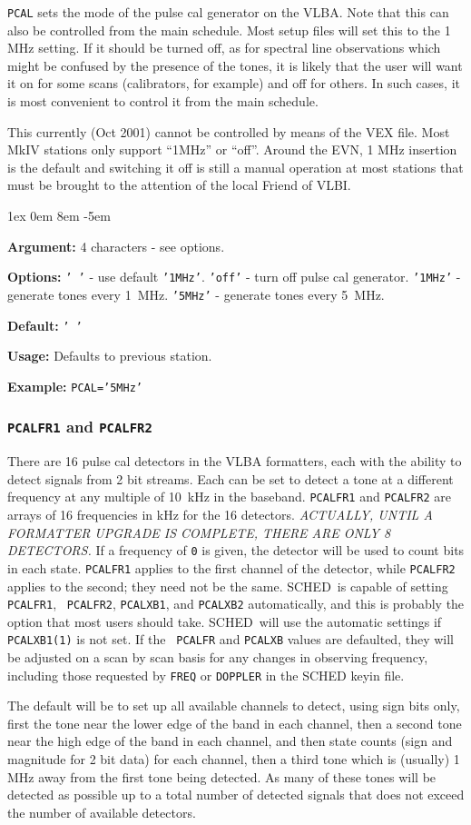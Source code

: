 \documentclass{report}
\newcommand{\schedb}{{\sc SCHED~}}
\newcommand{\rcwbox}[5]{
  \begin{list}{}{\parsep 1ex  \itemsep 0em
                 \leftmargin 8em  \itemindent -5em }
    \item {\bf Argument:} #1
    \item {\bf Options:}  #2
    \item {\bf Default:}  #3
    \item {\bf Usage:}    #4
    \item {\bf Example:}  #5
  \end{list}
}
\begin{document}
{\tt PCAL} sets the mode of the pulse cal generator on the VLBA.  Note
that this can also be controlled from the main schedule.  Most setup
files will set this to the 1 MHz setting.  If it should be turned
off, as for spectral line observations which might be confused by
the presence of the tones, it is likely that the user will want it
on for some scans (calibrators, for example) and off for others.  In
such cases, it is most convenient to control it from the main
schedule.

This currently (Oct 2001) cannot be controlled by means of the VEX
file. Most MkIV stations only support ``1MHz'' or ``off''. Around the
EVN, 1 MHz insertion is the default and switching it off is still a
manual operation at most stations that must be brought to the attention
of the local Friend of VLBI.

\rcwbox
{4 characters - see options.}
{{\tt ' '} - use default {\tt '1MHz'}. {\tt 'off'} - turn off pulse
cal generator. {\tt '1MHz'} - generate tones every 1~MHz. {\tt '5MHz'}
- generate tones every 5~MHz.}
{{\tt ' '}}
{Defaults to previous station.}
{{\tt PCAL='5MHz'}}


\subsubsection{\label{SP:PCALFR1}{\tt PCALFR1} and {\tt PCALFR2}}

There are 16 pulse cal detectors in the VLBA formatters, each with the
ability to detect signals from 2 bit streams. Each can be set to
detect a tone at a different frequency at any multiple of 10~kHz in
the baseband. {\tt PCALFR1} and {\tt PCALFR2} are arrays of 16
frequencies in kHz for the 16 detectors. {\em ACTUALLY, UNTIL A
FORMATTER UPGRADE IS COMPLETE, THERE ARE ONLY 8 DETECTORS.} If a
frequency of {\tt 0} is given, the detector will be used to count bits
in each state. {\tt PCALFR1} applies to the first channel of the
detector, while {\tt PCALFR2} applies to the second; they need not be
the same. \schedb is capable of setting {\tt PCALFR1}, {\tt
PCALFR2}, {\tt PCALXB1}, and {\tt PCALXB2} automatically, and this is
probably the option that most users should take. \schedb will use
the automatic settings if {\tt PCALXB1(1)} is not set.  If the {\tt
PCALFR} and {\tt PCALXB} values are defaulted, they will be adjusted
on a scan by scan basis for any changes in observing frequency,
including those requested by {\tt FREQ} or {\tt DOPPLER} in the {\sc
SCHED} keyin file.

The default will be to set up all available channels to detect, using
sign bits only, first the tone near the lower edge of the band in each
channel, then a second tone near the high edge of the band in each
channel, and then state counts (sign and magnitude for 2 bit data) for
each channel, then a third tone which is (usually) 1 MHz away from the
first tone being detected.  As many of these tones will be detected as
possible up to a total number of detected signals that does not exceed
the number of available detectors.
\end{document}
